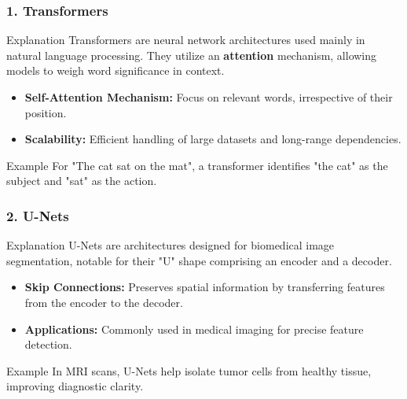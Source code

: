 \documentclass[aspectratio=169]{beamer}
\begin{document}
\begin{frame}[fragile]
    \frametitle{1. Transformers}
    \begin{block}{Explanation}
        Transformers are neural network architectures used mainly in natural language processing. They utilize an \textbf{attention} mechanism, allowing models to weigh word significance in context.
    \end{block}
    \begin{itemize}
        \item \textbf{Self-Attention Mechanism:} Focus on relevant words, irrespective of their position.
        \item \textbf{Scalability:} Efficient handling of large datasets and long-range dependencies.
    \end{itemize}
    \begin{block}{Example}
        For "The cat sat on the mat", a transformer identifies "the cat" as the subject and "sat" as the action.
    \end{block}
\end{frame}

\begin{frame}[fragile]
    \frametitle{2. U-Nets}
    \begin{block}{Explanation}
        U-Nets are architectures designed for biomedical image segmentation, notable for their "U" shape comprising an encoder and a decoder.
    \end{block}
    \begin{itemize}
        \item \textbf{Skip Connections:} Preserves spatial information by transferring features from the encoder to the decoder.
        \item \textbf{Applications:} Commonly used in medical imaging for precise feature detection.
    \end{itemize}
    \begin{block}{Example}
        In MRI scans, U-Nets help isolate tumor cells from healthy tissue, improving diagnostic clarity.
    \end{block}
\end{frame}
\end{document}
